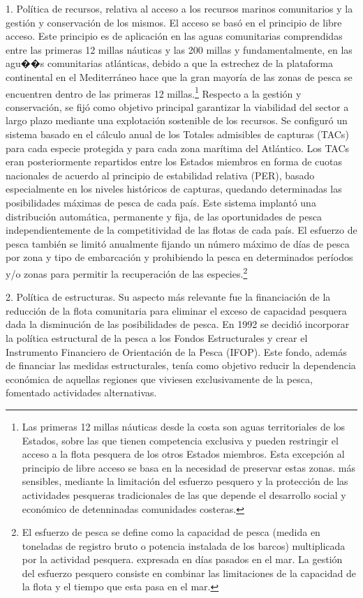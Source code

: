 \documentclass[10pt,a4paper]{article}
\begin{document}
1. Política de recursos, relativa al acceso a los recursos marinos comunitarios y la gestión y conservación de los mismos. El acceso se basó en el principio de libre acceso. Este principio es de aplicación en las aguas comunitarias comprendidas entre las primeras 12 millas náuticas y las 200 millas y fundamentalmente, en las agu��s comunitarias atlánticas, debido a que la estrechez de la plataforma continental en el Mediterráneo hace que la gran mayoría de las zonas de pesca se encuentren dentro de las primeras 12 millas.\footnote{%
    Las primeras 12 millas náuticas desde la costa son aguas territoriales de los Estados, sobre las que tienen competencia exclusiva y pueden restringir el acceso a la flota pesquera de los otros Estados miembros. Esta excepción al principio de libre acceso se basa en la necesidad de preservar estas zonas. más sensibles, mediante la limitación del esfuerzo pesquero y la protección de las actividades pesqueras tradicionales de las que depende el desarrollo social y económico de detenninadas comunidades costeras.
} Respecto a la gestión y conservación, se fijó como objetivo principal garantizar la viabilidad del sector a largo plazo mediante una explotación sostenible de los recursos. Se configuró un sistema basado en el cálculo anual de los Totales admisibles de capturas (TACs) para cada especie protegida y para cada zona marítima del Atlántico. Los TACs eran posteriormente repartidos entre los Estados miembros en forma de cuotas nacionales de acuerdo al principio de estabilidad relativa (PER), basado especialmente en los niveles históricos de capturas, quedando determinadas las posibilidades máximas de pesca de cada país. Este sistema implantó una distribución automática, permanente y fija, de las oportunidades de pesca independientemente de la competitividad de las flotas de cada país. El esfuerzo de pesca también se limitó anualmente fijando un número máximo de días de pesca por zona y tipo de embarcación y prohibiendo la pesca en determinados períodos y/o zonas para permitir la recuperación de las especies.\footnote{%
    El esfuerzo de pesca se define como la capacidad de pesca (medida en toneladas de registro bruto o potencia instalada de los barcos) multiplicada por la actividad pesquera. expresada en días pasados en el mar. La gestión del esfuerzo pesquero consiste en combinar las limitaciones de la capacidad de la flota y el tiempo que esta pasa en el mar.
}

2. Política de estructuras. Su aspecto más relevante fue la financiación de la reducción de la flota comunitaria para eliminar el exceso de capacidad pesquera dada la disminución de las posibilidades de pesca. En 1992 se decidió incorporar la política estructural de la pesca a los Fondos Estructurales y crear el Instrumento Financiero de Orientación de la Pesca (IFOP). Este fondo, además de financiar las medidas estructurales, tenía como objetivo reducir la dependencia económica de aquellas regiones que viviesen exclusivamente de la pesca, fomentado actividades alternativas.
\end{document}
